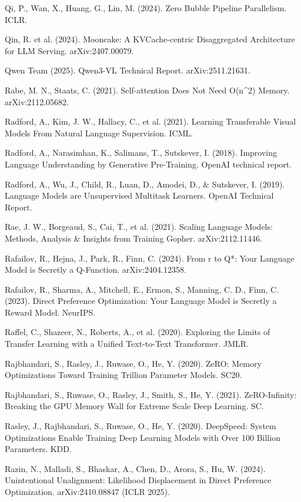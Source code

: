 {\begin{enumerate}[leftmargin=*,itemsep=1pt,label={[\arabic*]}]
\item Qi, P., Wan, X., Huang, G., Lin, M. (2024). Zero Bubble Pipeline Parallelism. ICLR.
\item Qin, R. et al. (2024). Mooncake: A KVCache-centric Disaggregated Architecture for LLM Serving. arXiv:2407.00079.
\item Qwen Team (2025). Qwen3-VL Technical Report. arXiv:2511.21631.
\item Rabe, M. N., Staats, C. (2021). Self-attention Does Not Need O(n\textasciicircum{}2) Memory. arXiv:2112.05682.
\item Radford, A., Kim, J. W., Hallacy, C., et al. (2021). Learning Transferable Visual Models From Natural Language Supervision. ICML.
\item Radford, A., Narasimhan, K., Salimans, T., Sutskever, I. (2018). Improving Language Understanding by Generative Pre-Training. OpenAI technical report.
\item Radford, A., Wu, J., Child, R., Luan, D., Amodei, D., \& Sutskever, I. (2019). Language Models are Unsupervised Multitask Learners. OpenAI Technical Report.
\item Rae, J. W., Borgeaud, S., Cai, T., et al. (2021). Scaling Language Models: Methods, Analysis \& Insights from Training Gopher. arXiv:2112.11446.
\item Rafailov, R., Hejna, J., Park, R., Finn, C. (2024). From r to Q*: Your Language Model is Secretly a Q-Function. arXiv:2404.12358.
\item Rafailov, R., Sharma, A., Mitchell, E., Ermon, S., Manning, C. D., Finn, C. (2023). Direct Preference Optimization: Your Language Model is Secretly a Reward Model. NeurIPS.
\item Raffel, C., Shazeer, N., Roberts, A., et al. (2020). Exploring the Limits of Transfer Learning with a Unified Text-to-Text Transformer. JMLR.
\item Rajbhandari, S., Rasley, J., Ruwase, O., He, Y. (2020). ZeRO: Memory Optimizations Toward Training Trillion Parameter Models. SC20.
\item Rajbhandari, S., Ruwase, O., Rasley, J., Smith, S., He, Y. (2021). ZeRO-Infinity: Breaking the GPU Memory Wall for Extreme Scale Deep Learning. SC.
\item Rasley, J., Rajbhandari, S., Ruwase, O., He, Y. (2020). DeepSpeed: System Optimizations Enable Training Deep Learning Models with Over 100 Billion Parameters. KDD.
\item Razin, N., Malladi, S., Bhaskar, A., Chen, D., Arora, S., Hu, W. (2024). Unintentional Unalignment: Likelihood Displacement in Direct Preference Optimization. arXiv:2410.08847 (ICLR 2025).

\end{enumerate}}
